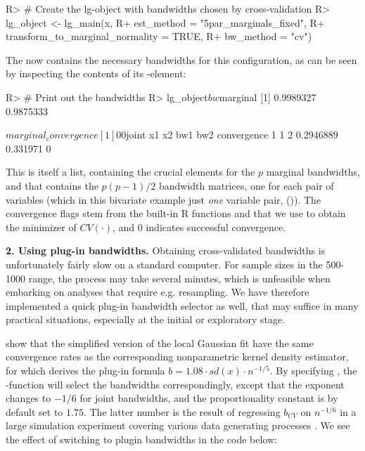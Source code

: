 \begin{example}
R> # Create the lg-object with bandwidths chosen by cross-validation
R> lg_object <- lg_main(x,
R+                      est_method = "5par_marginals_fixed",
R+                      transform_to_marginal_normality = TRUE,
R+                      bw_method = "cv")
\end{example}

The  now contains the necessary bandwidths for this configuration, as can be seen by inspecting the contents of its
-element:

\begin{example}
R> # Print out the bandwidths
R> lg_object$bw

$marginal
[1] 0.9989327 0.9875333

$marginal_convergence
[1] 0 0

$joint
x1 x2         bw1      bw2 convergence
1  1  2 0.2946889 0.331971           0
\end{example}
This is itself a list, containing the crucial elements  for the \(p\) marginal bandwidths, and  that contains the
\(p(p-1)/2\) bandwidth matrices, one for each pair of variables (which in this bivariate example just \emph{one} variable pair, ()). The convergence flags stem from the built-in R functions  and  that we use to obtain the minimizer of \(CV\left(\cdot\right)\), and 0 indicates successful convergence.

\textbf{2. Using plug-in bandwidths.} Obtaining cross-validated bandwidths is unfortunately fairly slow on a standard computer. For sample sizes in the 500-1000 range, the process may take several minutes, which is unfeasible when embarking on analyses that require e.g. resampling. We have therefore implemented a quick plug-in bandwidth selector as well, that may suffice in many practical situations, especially at the initial or exploratory stage. 

\cite{otne:tjos:2017} show that the simplified version of the local Gaussian fit have the same convergence rates as the corresponding nonparametric kernel density estimator, for which \cite{silv:1986} derives the plug-in formula \(b = 1.08\cdot sd\left(x\right) \cdot n^{-1/5}\). By
specifying , the -function will select the bandwidths correspondingly, except that the exponent changes to \(-1/6\) for joint bandwidths, and the proportionality constant is by default set to \(1.75\). The latter number is the result of regressing \(b_{CV}\) on \(n^{-1/6}\) in a large simulation experiment covering various data generating processes \citep{otneim2016multivariate}. We see
the effect of switching to plugin bandwidths in the code below: 

